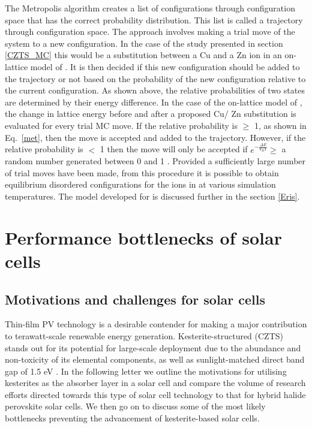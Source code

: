 \documentclass[11pt, twoside]{report}
\begin{document}
The Metropolis algorithm creates a list of configurations through configuration space that has the correct probability distribution. This list is called a trajectory through configuration space. The approach involves making a trial move of the system to a new configuration. In the case of the study presented in section \ref{CZTS_MC} \cite{eris_paper} this would be a substitution between a Cu and a Zn ion in an on-lattice model of {\CZTS}. It is then decided if this new configuration should be added to the trajectory or not based on the probability of the new configuration relative to the current configuration. As shown above, the relative probabilities of two states are determined by their energy difference. In the case of the on-lattice model of {\CZTS}, the change in lattice energy before and after a proposed Cu/ Zn substitution is evaluated for every trial MC move. If the relative probability is  $\geq$ 1, as shown in Eq.~\ref{met}, then the move is accepted and added to the trajectory. However, if the relative probability is $<$ 1 then the move will only be accepted if $e^{-\frac{\Delta E}{k_BT}} \ge$ a random number generated between 0 and 1 \cite{Lesar3}. Provided a sufficiently large number of trial moves have been made, from this procedure it is possible to obtain equilibrium disordered configurations for the ions in {\CZTS} at various simulation temperatures. The model developed for {\CZTS} is discussed further in the section \ref{Eris}.






\chapter{Performance bottlenecks of {\CZTS} solar cells}\label{chap:CZTS}
\section{Motivations and challenges for {\CZTS} solar cells}
Thin-film PV technology is a desirable contender for making a major contribution to terawatt-scale renewable energy generation. Kesterite-structured {\CZTS} (CZTS) stands out for its potential for large-scale deployment due to the abundance and non-toxicity of its elemental components, as well as sunlight-matched direct band gap of 1.5 eV \cite{CZTS_rev}. In the following letter we outline the motivations for utilising kesterites as the absorber layer in a solar cell and compare the volume of research efforts directed towards this type of solar cell technology to that for hybrid halide perovskite solar cells. We then go on to discuss some of the most likely bottlenecks preventing the advancement of kesterite-based solar cells.
\end{document}

